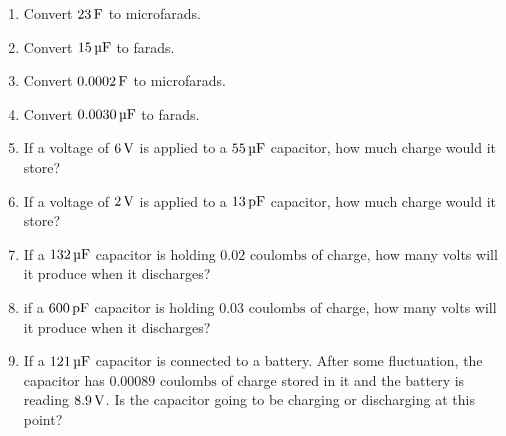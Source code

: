 
\begin{enumerate}
\item Convert $23\,\si{\farad}$ to microfarads.
\item Convert $15\,\si{\micro\farad}$ to farads.
\item Convert $0.0002\,\si{\farad}$ to microfarads.
\item Convert $0.0030\,\si{\micro\farad}$ to farads.
\item If a voltage of $6\,\si{\volt}$ is applied to a $55\,\si{\micro\farad}$ capacitor, how much charge would it store?
\item If a voltage of $2\,\si{\volt}$ is applied to a $13\mypf$ capacitor, how much charge would it store?
\item If a $132\,\si{\micro\farad}$ capacitor is holding $0.02\textrm{ coulombs}$ of charge, how many volts will it produce when it discharges?
\item if a $600\mypf$ capacitor is holding $0.03\textrm{ coulombs}$ of charge, how many volts will it produce when it discharges?
\item If a $121\,\si{\micro\farad}$ capacitor is connected to a battery.  After some fluctuation, the capacitor has $0.00089\textrm{ coulombs}$ of charge stored in it and the battery is reading $8.9\,\si{\volt}$.  Is the capacitor going to be charging or discharging at this point?
\end{enumerate}
